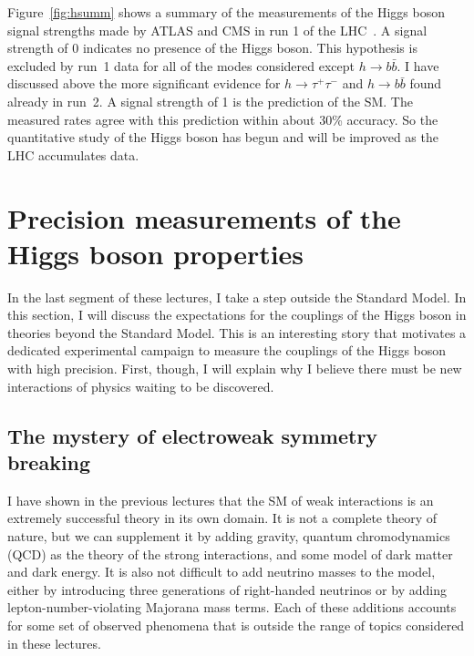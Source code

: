 \documentclass[12pt]{article}
\begin{document}
Figure~\ref{fig:hsumm} shows a summary of the measurements of the
Higgs boson signal strengths made by ATLAS and CMS in run 1 of the
LHC~\cite{PDGHiggs}.   A signal strength of 0 indicates no presence of
the Higgs boson.  This hypothesis is excluded by run~1 data for all of the modes
considered except $h\to b\bar b$. I have discussed above the more
significant evidence for $h\to \tau^+\tau^-$ and $h\to b\bar b$ found
already in run~2.   A signal strength of 1 is the
prediction of the SM.   The measured rates agree with this
prediction within about 30\% accuracy.   So the quantitative study of
the Higgs boson has begun and will be improved as the LHC accumulates data.








\section{Precision measurements of the Higgs boson properties}

In the last segment of these lectures, I take a step outside the
Standard Model.  In this section, I will discuss the expectations for
the couplings of the Higgs boson in theories beyond the Standard
Model.   This is an interesting story that motivates a dedicated
experimental campaign to measure the couplings of the Higgs boson with 
high precision.   First, though, I will explain why I believe there
must be new interactions of physics waiting to be discovered.




\subsection{The mystery of electroweak symmetry breaking}

I have shown in the previous lectures that the SM of weak
interactions is an extremely successful theory in its own domain.   It
is not a complete theory of nature, but we can supplement it by adding
gravity, quantum chromodynamics (QCD) as the theory of the strong
interactions,
and some model of dark matter and dark energy.   It is also not
difficult to add neutrino masses to the model, either by introducing
three generations of right-handed neutrinos or by adding
lepton-number-violating Majorana mass terms.  Each of these additions
accounts for some set of observed phenomena that is outside the range
of topics considered in these lectures.
\end{document}
